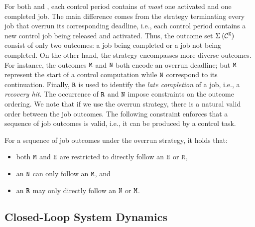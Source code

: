 For both \tK{} and \tS{}, each control period contains \emph{at most} one activated and one completed job.
The main difference comes from the \tK{} strategy terminating every job that overrun its corresponding deadline, i.e., each control period contains a new control job being released and activated.
Thus, the outcome set $\Sigma\,({\mathcal{C}^{\texttt{K}}})$ consist of only two outcomes: a job being completed or a job not being completed.
On the other hand, the \tS{} strategy encompasses more diverse outcomes.
For instance, the outcomes $\texttt{M}$ and $\texttt{N}$ both encode an overrun deadline; but $\texttt{M}$ represent the start of a control computation while $\texttt{N}$ correspond to its continuation.
Finally, $\texttt{R}$ is used to identify the \emph{late completion} of a job, i.e., a \emph{recovery hit}.
The occurrence of $\texttt{R}$ and $\texttt{N}$ impose constraints on the outcome ordering.
We note that if we use the \tS{} overrun strategy, there is a natural valid order between the job outcomes.
The following constraint enforces that a sequence of job outcomes is valid, i.e., it can be produced by a control task.
%
\begin{constraint}%
    \label{rule:1}%
    For a sequence of job outcomes under the \tS{} overrun strategy, it holds that: 
    \begin{itemize}
        \item both $\texttt{M}$ and $\texttt{H}$ are restricted to directly follow an $\texttt{H}$ or $\texttt{R}$,
        \item an $\texttt{N}$ can only follow an $\texttt{M}$, and
        \item an $\texttt{R}$ may only directly follow an $\texttt{N}$ or $\texttt{M}$.
    \end{itemize}
\end{constraint}

\subsection{Closed-Loop System Dynamics}%
\label{sec:dynamics}%

